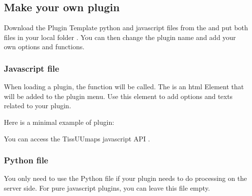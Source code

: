 \documentclass[letterpaper,10pt,english,openany,oneside]{sphinxmanual}
\begin{document}
\subsection{Make your own plugin}
\label{\detokenize{docs/starting/plugins:make-your-own-plugin}}
\sphinxAtStartPar
Download the Plugin Template python and javascript files from the  and put both files in your local folder . You can then change the plugin name and add your own options and functions.


\subsubsection{Javascript file}
\label{\detokenize{docs/starting/plugins:javascript-file}}
\sphinxAtStartPar
When loading a plugin, the function  will be called. The  is an html Element that will be added to the plugin menu. Use this element to add options and texts related to your plugin.

\sphinxAtStartPar
{}

\sphinxAtStartPar
Here is a minimal example of plugin:

\begin{sphinxVerbatim}[commandchars=\\\{\}]
 
  
 
    
      
\end{sphinxVerbatim}

\sphinxAtStartPar
You can access the TissUUmaps javascript API .


\subsubsection{Python file}
\label{\detokenize{docs/starting/plugins:python-file}}
\sphinxAtStartPar
You only need to use the Python file if your plugin needs to do processing on the server side. For pure javascript plugins, you can leave this file empty.
\end{document}
